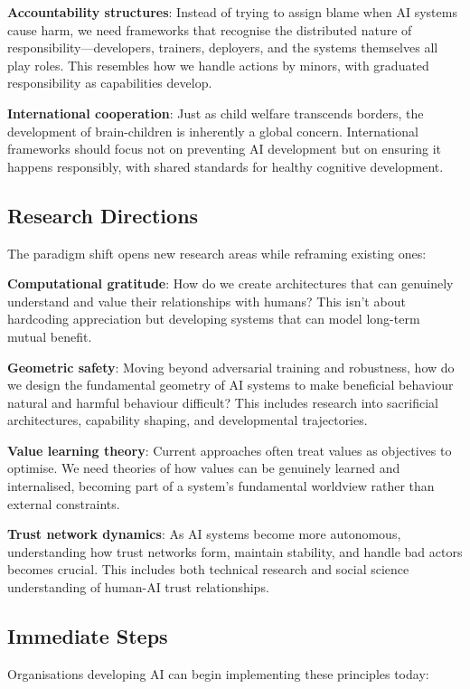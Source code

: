 \documentclass[acmsmall,screen]{acmart}
\begin{document}
\textbf{Accountability structures}: Instead of trying to assign blame when AI systems cause harm, we need frameworks that recognise the distributed nature of responsibility—developers, trainers, deployers, and the systems themselves all play roles. This resembles how we handle actions by minors, with graduated responsibility as capabilities develop.

\textbf{International cooperation}: Just as child welfare transcends borders, the development of brain-children is inherently a global concern. International frameworks should focus not on preventing AI development but on ensuring it happens responsibly, with shared standards for healthy cognitive development.

\subsection{Research Directions}

The paradigm shift opens new research areas while reframing existing ones:

\textbf{Computational gratitude}: How do we create architectures that can genuinely understand and value their relationships with humans? This isn't about hardcoding appreciation but developing systems that can model long-term mutual benefit.

\textbf{Geometric safety}: Moving beyond adversarial training and robustness, how do we design the fundamental geometry of AI systems to make beneficial behaviour natural and harmful behaviour difficult? This includes research into sacrificial architectures, capability shaping, and developmental trajectories.

\textbf{Value learning theory}: Current approaches often treat values as objectives to optimise. We need theories of how values can be genuinely learned and internalised, becoming part of a system's fundamental worldview rather than external constraints.

\textbf{Trust network dynamics}: As AI systems become more autonomous, understanding how trust networks form, maintain stability, and handle bad actors becomes crucial. This includes both technical research and social science understanding of human-AI trust relationships.

\subsection{Immediate Steps}

Organisations developing AI can begin implementing these principles today:
\end{document}
